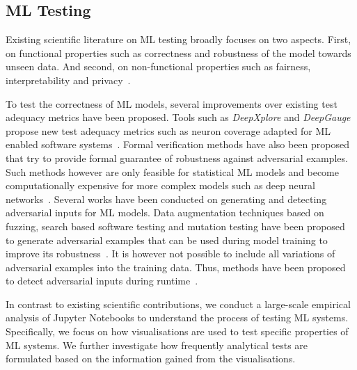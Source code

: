 \subsection{ML Testing}\label{sec:ml-testing}


Existing scientific literature on ML testing broadly focuses on two aspects. First, on functional properties such as correctness and robustness of the model towards unseen data. And second, on non-functional properties such as fairness, interpretability and privacy~\cite{zhang2020machine,mehrabi2021survey,chen2022fairness}.

To test the correctness of ML models, several improvements over existing test adequacy metrics have been proposed. Tools such as \textit{DeepXplore} and \textit{DeepGauge} propose new test adequacy metrics such as neuron coverage adapted for ML enabled software systems~\cite{pei2017deepxplore,ma2018deepgauge,gerasimou2020importance-driven}. Formal verification methods have also been proposed that try to provide formal guarantee of robustness against adversarial examples. Such methods however are only feasible for statistical ML models and become computationally expensive for more complex models such as deep neural networks~\cite{zhu2021deepmemory,baluta2021scalable}. Several works have been conducted on generating and detecting adversarial inputs for ML models. Data augmentation techniques based on fuzzing, search based software testing and mutation testing have been proposed to generate adversarial examples that can be used during model training to improve its robustness~\cite{braiek2019deepevolution,gao2020fuzz,wang2021robot,zhang2020white-box}. It is however not possible to include all variations of adversarial examples into the training data. Thus, methods have been proposed to detect adversarial inputs during runtime~\cite{xiao2021self-checking,wang2020dissector,wang2019adversarial,berend2020cats}.

In contrast to existing scientific contributions, we conduct a large-scale empirical analysis of Jupyter Notebooks to understand the process of testing ML systems. Specifically, we focus on how visualisations are used to test specific properties of ML systems. We further investigate how frequently analytical tests are formulated based on the information gained from the visualisations.

